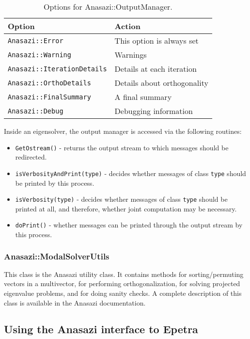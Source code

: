 \begin{table}
\begin{center}
\begin{tabular}{| p{7cm} l |}
\hline
Option & Action \\
\hline
{\tt Anasazi::Error} & 
  This option is always set \\
{\tt Anasazi::Warning} & 
  Warnings \\
{\tt Anasazi::IterationDetails} & 
  Details at each iteration \\
{\tt Anasazi::OrthoDetails} & 
  Details about orthogonality \\
{\tt Anasazi::FinalSummary} & 
  A final summary \\
{\tt Anasazi::Debug} & 
  Debugging information \\
\hline
\end{tabular}
\caption{Options for Anasazi::OutputManager.}
\label{tab:anasazi:om}
\end{center}
\end{table}

Inside an eigensolver, the output manager is accessed via the following
routines:
\begin{itemize}
\item \verb!GetOstream()! - returns the output stream to which messages should
be redirected.
\item \verb!isVerbosityAndPrint(type)! - decides whether messages of class
\verb!type! should be printed by this process.
\item \verb!isVerbosity(type)! - decides whether messages of class \verb!type!
should be printed at all, and therefore, whether joint computation may be
necessary.
\item \verb!doPrint()! - whether messages can be printed through the output
stream by this process.
\end{itemize}

\subsubsection{Anasazi::ModalSolverUtils}
\label{sec:anasazi:msu}

This class is the Anasazi utility class. It contains methods for
sorting/permuting vectors in a multivector, for performing orthogonalization,
for solving projected eigenvalue problems, and for doing sanity checks. A
complete description of this class is available in the Anasazi documentation.

\subsection{Using the Anasazi interface to Epetra}
\label{sec:anasazi:epetra}


